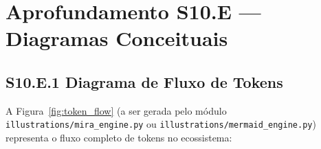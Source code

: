 
\section*{Aprofundamento S10.E --- Diagramas Conceituais}

\subsection*{S10.E.1 Diagrama de Fluxo de Tokens}

A Figura~\ref{fig:token_flow} (a ser gerada pelo módulo \texttt{illustrations/mira\_engine.py} ou \texttt{illustrations/mermaid\_engine.py}) representa o fluxo completo de tokens no ecossistema:

